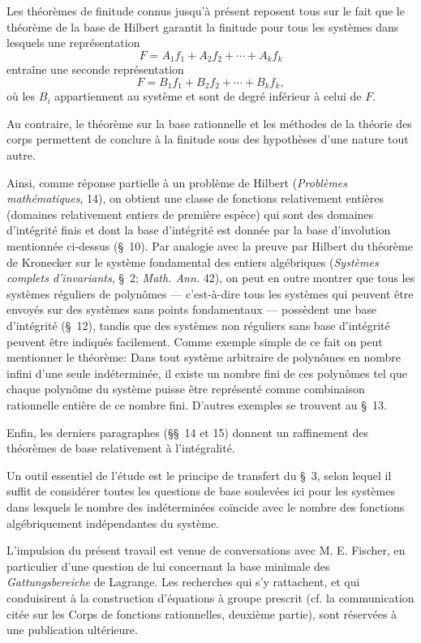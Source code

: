 \documentclass[11pt]{article}
\begin{document}
Les théorèmes de finitude connus jusqu'à présent reposent tous sur le fait que le théorème de la base de Hilbert garantit la finitude pour tous les systèmes dans lesquels une représentation
\[
  F=A_1f_1+A_2f_2+\cdots+A_kf_k
\]
entraîne une seconde représentation
\[
  F=B_1f_1+B_2f_2+\cdots+B_kf_k,
\]
où les $B_i$ appartiennent au système et sont de degré inférieur à celui de $F$.

Au contraire, le théorème sur la base rationnelle et les méthodes de la théorie des corps permettent de conclure à la finitude sous des hypothèses d'une nature tout autre.

Ainsi, comme réponse partielle à un problème de Hilbert (\emph{Problèmes mathématiques}, 14), on obtient une classe de fonctions relativement entières (domaines relativement entiers de première espèce) qui sont des domaines d’intégrité finis et dont la base d'intégrité est donnée par la base d'involution mentionnée ci-dessus (\S\ 10). Par analogie avec la preuve par Hilbert du théorème de Kronecker sur le système fondamental des entiers algébriques (\emph{Systèmes complets d'invariants}, \S\ 2; \emph{Math. Ann.} 42), on peut en outre montrer que tous les systèmes réguliers de polynômes --- c'est-à-dire tous les systèmes qui peuvent être envoyés sur des systèmes sans points fondamentaux --- possèdent une base d'intégrité (\S\ 12), tandis que des systèmes non réguliers sans base d'intégrité peuvent être indiqués facilement. Comme exemple simple de ce fait on peut mentionner le théorème: \og{}Dans tout système arbitraire de polynômes en nombre infini d'une seule indéterminée, il existe un nombre fini de ces polynômes tel que chaque polynôme du système puisse être représenté comme combinaison rationnelle entière de ce nombre fini.\fg{} D'autres exemples se trouvent au \S\ 13.

Enfin, les derniers paragraphes (\S\S\ 14 et 15) donnent un raffinement des théorèmes de base relativement à l'intégralité.

Un outil essentiel de l'étude est le principe de transfert du \S\ 3, selon lequel il suffit de considérer toutes les questions de base soulevées ici pour les systèmes dans lesquels le nombre des indéterminées coïncide avec le nombre des fonctions algébriquement indépendantes du système.

L'impulsion du présent travail est venue de conversations avec M. E. Fischer, en particulier d'une question de lui concernant la base minimale des \emph{Gattungsbereiche} de Lagrange. Les recherches qui s'y rattachent, et qui conduisirent à la construction d'équations à groupe prescrit (cf. la communication citée sur les \og{}Corps de fonctions rationnelles\fg{}, deuxième partie), sont réservées à une publication ultérieure.
\end{document}
